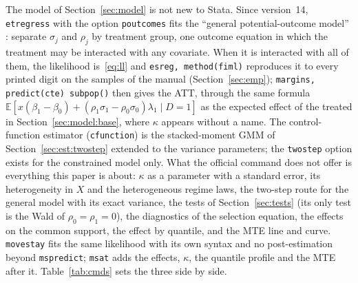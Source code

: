 \documentclass[11pt,a4paper]{article}
\theoremstyle{plain}
\theoremstyle{definition}
\theoremstyle{remark}
\newcommand{\E}{\mathbb{E}}
\newcommand{\1}{\mathbf{1}}
\newcommand{\cmd}[1]{\texttt{#1}}
\begin{document}
The model of Section~\ref{sec:model} is not new to Stata. Since
version~14, \cmd{etregress} with the option \cmd{poutcomes} fits the
``general potential-outcome model'' \citep{statacorp2025}: separate
$\sigma_j$ and $\rho_j$ by treatment group, one outcome equation in
which the treatment may be interacted with any covariate. When it is
interacted with all of them, the likelihood is~\eqref{eq:ll} and
\cmd{esreg, method(fiml)} reproduces it to every printed digit on the
samples of the manual (Section~\ref{sec:emp}); \cmd{margins,
predict(cte) subpop()} then gives the ATT, through the same formula
$\E[x(\beta_1-\beta_0)+(\rho_1\sigma_1-\rho_0\sigma_0)\lambda_1\mid D=1]$
as the expected effect of the treated in Section~\ref{sec:model:base}, where $\kappa$ appears without a name. The
control-function estimator (\cmd{cfunction}) is the stacked-moment GMM of
Section~\ref{sec:est:twostep} extended to the variance parameters; the
\cmd{twostep} option exists for the constrained model only. What the
official command does not offer is everything this paper is about:
$\kappa$ as a parameter with a standard error, its heterogeneity in $X$
and the heterogeneous regime laws, the two-step route for the general
model with its exact variance, the tests of Section~\ref{sec:tests}
(its only test is the Wald of $\rho_0=\rho_1=0$), the diagnostics of the
selection equation, the effects on the common support, the effect by
quantile, and the MTE line and curve. \cmd{movestay} \citep{lokshin2004}
fits the same likelihood with its own syntax and no post-estimation
beyond \cmd{mspredict}; \cmd{msat} \citep{araar2026msat} adds the effects,
$\kappa$, the quantile profile and the MTE after it.
Table~\ref{tab:cmds} sets the three side by side.
\end{document}
